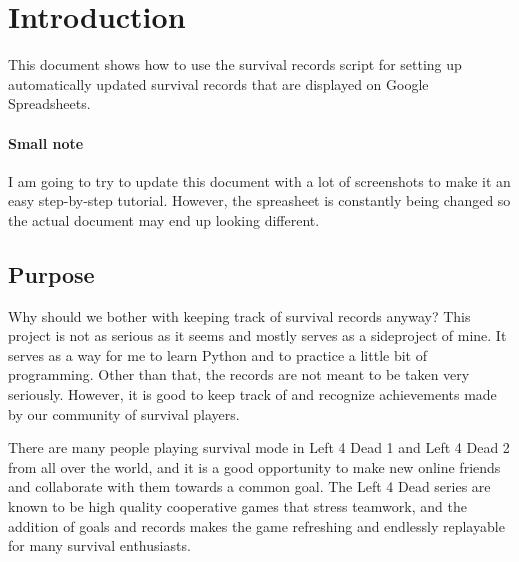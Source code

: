 \section{Introduction}
This document shows how to use the survival records script for setting up automatically updated survival records that are displayed on Google Spreadsheets.
\paragraph{Small note}
I am going to try to update this document with a lot of screenshots to make it an easy step-by-step tutorial. However, the spreasheet is constantly being changed so the actual document may end up looking different.
\subsection{Purpose}
Why should we bother with keeping track of survival records anyway? This project is not as serious as it seems and mostly serves as a sideproject of mine. It serves as a way for me to learn Python and to practice a little bit of programming. Other than that, the records are not meant to be taken very seriously. However, it is good to keep track of and recognize achievements made by our community of survival players.

There are many people playing survival mode in Left 4 Dead 1 and Left 4 Dead 2 from all over the world, and it is a good opportunity to make new online friends and collaborate with them towards a common goal. The Left 4 Dead series are known to be high quality cooperative games that stress teamwork, and the addition of goals and records makes the game refreshing and endlessly replayable for many survival enthusiasts.

